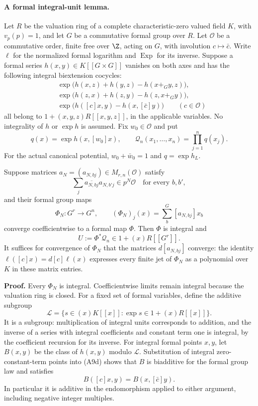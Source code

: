 \paragraph{A formal integral-unit lemma.}
Let $R$ be the valuation ring of a complete characteristic-zero
valued field $K$, with $v_p(p)=1$, and let $G$ be a commutative
formal group over $R$.  Let $\mathcal O$ be a commutative order, finite free
over $\Z$, acting on $G$, with involution $c\mapsto\bar c$.
Write $\ell$ for the normalized formal logarithm and
$\operatorname{Exp}$ for its inverse.  Suppose a formal series
$h(x,y)\in K[[G\times G]]$ vanishes on both axes and has the
following integral biextension cocycles:
\[
\begin{split}
 &\exp\bigl(h(x,z)+h(y,z)-h(x+_G y,z)\bigr),\\
 &\exp\bigl(h(z,x)+h(z,y)-h(z,x+_G y)\bigr),\\
 &\exp\bigl(h([c]x,y)-h(x,[\bar c]y)\bigr)
       \qquad(c\in\mathcal O)
\end{split}
 \tag{A9d}
\]
all belong to $1+(x,y,z)R[[x,y,z]]$, in the applicable variables.
No integrality of $h$ or $\exp h$ is assumed.
Fix $w_0\in\mathcal O$ and put
\[
 q(x)=\exp h(x,[w_0]x),\qquad
 \mathcal Q_n(x_1,\ldots,x_n)=\prod_{j=1}^n q(x_j).
 \tag{A9e}
\]
For the actual canonical potential, $w_0+\bar w_0=1$ and
$q=\exp h_L$.

Suppose matrices $a_N=(a_{N,bj})\in M_{r,n}(\mathcal O)$
satisfy
\[
 \sum_j\overline{a_{N,bj}}a_{N,b'j}\in p^N\mathcal O
       \quad\text{for every }b,b',
 \tag{A9f}
\]
and their formal group maps
\[
 \Phi_N:G^r\longrightarrow G^n,\qquad
 (\Phi_N)_j(x)=\sum_b^G[a_{N,bj}]x_b
\]
converge coefficientwise to a formal map $\Phi$.
Then $\Phi$ is integral and
\[
                 U:=\Phi^*\mathcal Q_n
                     \in 1+(x)R[[G^r]] .
 \tag{A9g}
\]
It suffices for convergence of $\Phi_N$ that the matrices
$d[a_{N,bj}]$ converge: the identity
$\ell([c]x)=d[c]\ell(x)$ expresses every finite jet of
$\Phi_N$ as a polynomial over $K$ in these matrix entries.

\textbf{Proof.}
Every $\Phi_N$ is integral.  Coefficientwise limits remain
integral because the valuation ring is closed.
For a fixed set of formal variables, define the additive
subgroup
\[
 \mathcal L
  =\{s\in(x)K[[x]]:\exp s\in1+(x)R[[x]]\}.
\]
It is a subgroup: multiplication of integral units corresponds
to addition, and the inverse of a series with integral
coefficients and constant term one is integral, by the
coefficient recursion for its inverse.
For integral formal points $x,y$, let $B(x,y)$ be the class of
$h(x,y)$ modulo $\mathcal L$.  Substitution of integral
zero-constant-term points into (A9d) shows that $B$ is
biadditive for the formal group law and satisfies
\[
             B([c]x,y)=B(x,[\bar c]y).
 \tag{A9h}
\]
In particular it is additive in the endomorphism applied to
either argument, including negative integer multiples.

